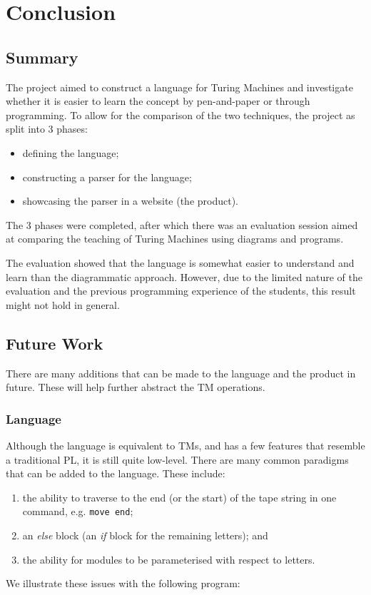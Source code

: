 \chapter{Conclusion}


\section{Summary}
The project aimed to construct a language for Turing Machines and investigate whether it is easier to learn the concept by pen-and-paper or through programming. To allow for the comparison of the two techniques, the project as split into 3 phases:
\begin{itemize}
    \item defining the language;
    \item constructing a parser for the language;
    \item showcasing the parser in a website (the product).
\end{itemize}
The 3 phases were completed, after which there was an evaluation session aimed at comparing the teaching of Turing Machines using diagrams and programs.

The evaluation showed that the language is somewhat easier to understand and learn than the diagrammatic approach. However, due to the limited nature of the evaluation and the previous programming experience of the students, this result might not hold in general.

\section{Future Work}

There are many additions that can be made to the language and the product in future. These will help further abstract the TM operations.

\subsection{Language}
Although the language is equivalent to TMs, and has a few features that resemble a traditional PL, it is still quite low-level. There are many common paradigms that can be added to the language. These include:
\begin{enumerate}
    \item the ability to traverse to the end (or the start) of the tape string in one command, e.g. \texttt{move end}; 
    \item an \textit{else} block (an \textit{if} block for the remaining letters); and
    \item the ability for modules to be parameterised with respect to letters.
\end{enumerate}
We illustrate these issues with the following program:


